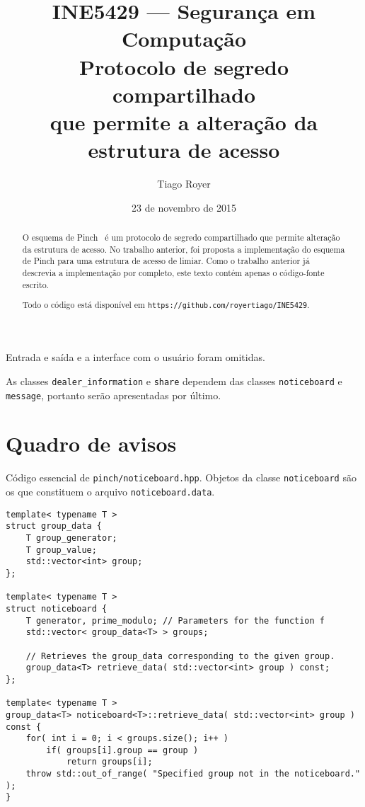 \documentclass[10pt]{article}
\begin{document}
\title{
    INE5429 --- Segurança em Computação \\[1ex]
    Protocolo de segredo compartilhado \\
    que permite a alteração da estrutura de acesso \\[1ex]
}
\author{Tiago Royer}
\date{23 de novembro de 2015}
\maketitle

\begin{abstract}
    O esquema de Pinch~\cite{Pinch1996}
    é um protocolo de segredo compartilhado
    que permite alteração da estrutura de acesso.
    No trabalho anterior,
    foi proposta a implementação do esquema de Pinch
    para uma estrutura de acesso de limiar.
    Como o trabalho anterior já descrevia a implementação por completo,
    este texto contém apenas o código-fonte escrito.

    Todo o código está disponível em \verb"https://github.com/royertiago/INE5429".
\end{abstract}

Entrada e saída e a interface com o usuário foram omitidas.

As classes \verb"dealer_information" e \verb"share"
dependem das classes \verb"noticeboard" e \verb"message",
portanto serão apresentadas por último.

\section{Quadro de avisos}

Código essencial de \verb"pinch/noticeboard.hpp".
Objetos da classe \verb"noticeboard" são os que constituem o arquivo
\verb"noticeboard.data".

\begin{verbatim}
template< typename T >
struct group_data {
    T group_generator;
    T group_value;
    std::vector<int> group;
};

template< typename T >
struct noticeboard {
    T generator, prime_modulo; // Parameters for the function f
    std::vector< group_data<T> > groups;

    // Retrieves the group_data corresponding to the given group.
    group_data<T> retrieve_data( std::vector<int> group ) const;
};

template< typename T >
group_data<T> noticeboard<T>::retrieve_data( std::vector<int> group ) const {
    for( int i = 0; i < groups.size(); i++ )
        if( groups[i].group == group )
            return groups[i];
    throw std::out_of_range( "Specified group not in the noticeboard." );
}
\end{verbatim}
\end{document}
